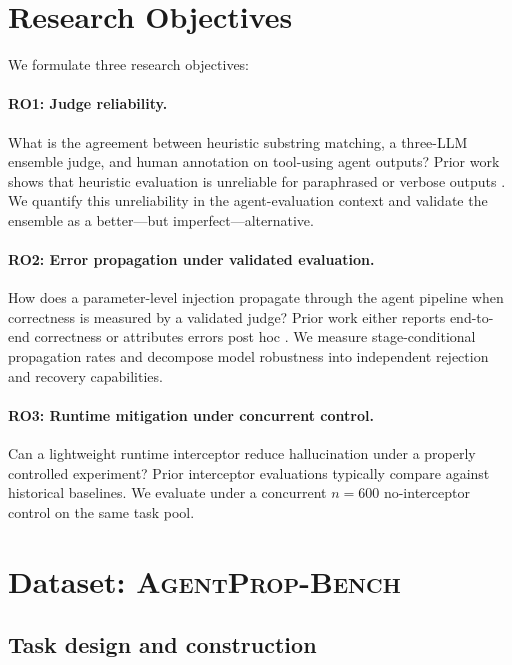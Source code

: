 \documentclass[11pt]{article}
\newcommand{\bench}{\textsc{AgentProp-Bench}\xspace}
\begin{document}
\section{Research Objectives}
\label{sec:ro}

We formulate three research objectives:

\paragraph{RO1: Judge reliability.}
What is the agreement between heuristic substring matching, a
three-LLM ensemble judge, and human annotation on tool-using agent
outputs?
Prior work shows that heuristic evaluation is unreliable for
paraphrased or verbose outputs \citep{soboroff2024dont}.
We quantify this unreliability in the agent-evaluation context and
validate the ensemble as a better---but imperfect---alternative.

\paragraph{RO2: Error propagation under validated evaluation.}
How does a parameter-level injection propagate through the agent
pipeline when correctness is measured by a validated judge?
Prior work either reports end-to-end correctness or attributes
errors post hoc \citep{liu2026agenthallu}.
We measure stage-conditional propagation rates and decompose model
robustness into independent rejection and recovery capabilities.

\paragraph{RO3: Runtime mitigation under concurrent control.}
Can a lightweight runtime interceptor reduce hallucination under a
properly controlled experiment?
Prior interceptor evaluations \citep{wang2026agentspec} typically
compare against historical baselines.
We evaluate under a concurrent $n{=}600$ no-interceptor control on
the same task pool.


\section{Dataset: \bench{}}
\label{sec:dataset}

\subsection{Task design and construction}
\end{document}
